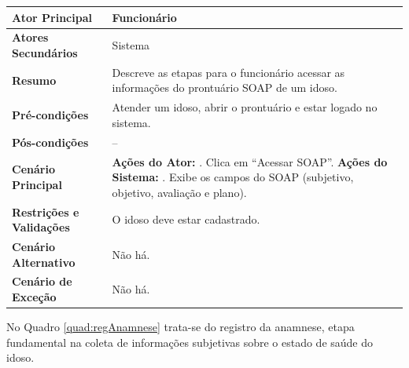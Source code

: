 \begin{quadro}[H]
	\centering
	\caption{UC: Acessar SOAP}
	\begin{tabular}{|p{5cm}|p{10cm}|}
		\hline
		\textbf{Ator Principal} & Funcionário \\ \hline
		
		\textbf{Atores Secundários} & Sistema \\ \hline
		
		\textbf{Resumo} & Descreve as etapas para o funcionário acessar as informações do prontuário SOAP de um idoso. \\ \hline
		
		\textbf{Pré-condições} & Atender um idoso, abrir o prontuário e estar logado no sistema. \\ \hline
		
		\textbf{Pós-condições} & -- \\ \hline
		
		\textbf{Cenário Principal} &
		\textbf{Ações do Ator:} \newline
		1. Clica em “Acessar SOAP”. \newline
		\textbf{Ações do Sistema:} \newline
		2. Exibe os campos do SOAP (subjetivo, objetivo, avaliação e plano). \\ \hline
		
		\textbf{Restrições e Validações} & O idoso deve estar cadastrado. \\ \hline
		
		\textbf{Cenário Alternativo} & Não há. \\ \hline
		
		\textbf{Cenário de Exceção} & Não há. \\ \hline
	\end{tabular}
	\label{quad:acessarSOAP}
\end{quadro}

No Quadro \ref{quad:regAnamnese} trata-se do registro da anamnese, etapa fundamental na coleta de informações subjetivas sobre o estado de saúde do idoso.

